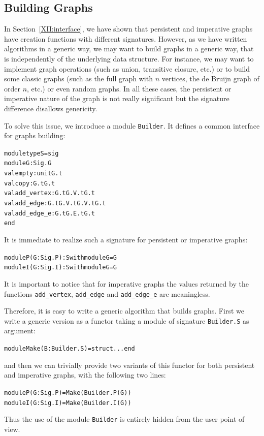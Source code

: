 \subsection{Building Graphs}\label{XII:builder}

In Section~\ref{XII:interface}, we have shown that persistent and
imperative graphs have creation functions with different signatures.
However, as we have written algorithms in a generic way, we may want
to build graphs in a generic way, that is independently of the
underlying data structure. For instance, we may want to implement
graph operations (such as union, transitive closure, etc.) or to build
some classic graphs (such as the full graph with $n$ vertices, the de
Bruijn graph of order $n$, etc.) or even random graphs. In all these
cases, the persistent or imperative nature of the graph is not really
significant but the signature difference disallows genericity.

To solve this issue, we introduce a module \texttt{Builder}. It
defines a common interface for graphs building:
\begin{alltt}
module type S = sig
  module G : Sig.G
  val empty : unit \fl G.t
  val copy : G.t \fl G.t
  val add_vertex : G.t \fl G.V.t \fl G.t
  val add_edge : G.t \fl G.V.t \fl G.V.t \fl G.t
  val add_edge_e : G.t \fl G.E.t \fl G.t
end
\end{alltt}
It is immediate to realize such a signature for persistent or
imperative graphs:
\begin{alltt}
module P(G : Sig.P) : S with module G = G
module I(G : Sig.I) : S with module G = G
\end{alltt}
It is important to notice that for imperative graphs the values
returned by the functions \texttt{add\_vertex},
\texttt{add\_edge} and \texttt{add\_edge\_e} are meaningless.

Therefore, it is easy to write a generic algorithm that builds graphs.
First we write a generic version as a functor taking a module of
signature \texttt{Builder.S} as argument:
\begin{alltt}
module Make(B : Builder.S) = struct ... end
\end{alltt}
and then we can trivially provide two variants of this functor for
both persistent and imperative graphs, with the following two lines:
\begin{alltt}
module P(G : Sig.P) = Make(Builder.P(G))
module I(G : Sig.I) = Make(Builder.I(G))
\end{alltt}
Thus the use of the module \texttt{Builder} is entirely hidden from
the user point of view.


